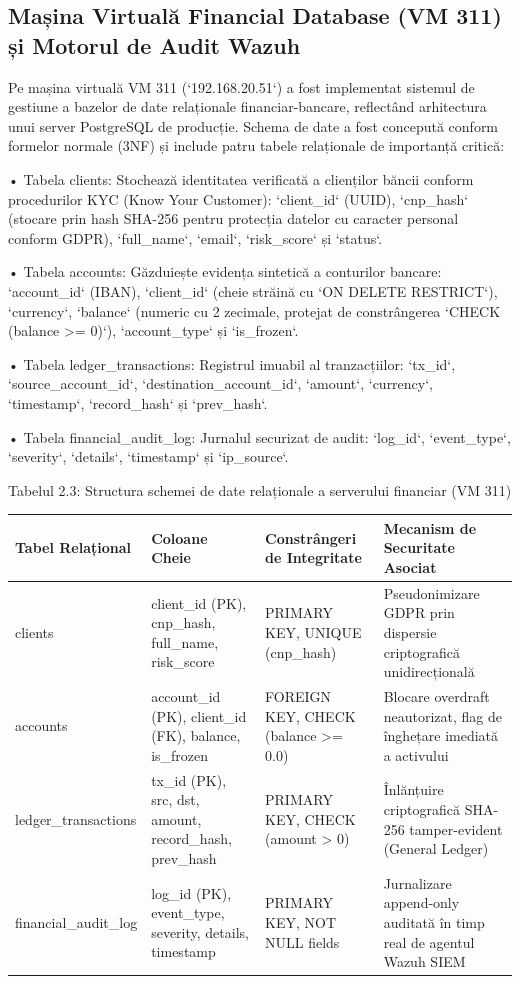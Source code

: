\subsection{Mașina Virtuală Financial Database (VM 311) și Motorul de Audit Wazuh}

Pe mașina virtuală VM 311 (`192.168.20.51`) a fost implementat sistemul de gestiune a bazelor de date relaționale financiar-bancare, reflectând arhitectura unui server PostgreSQL de producție. Schema de date a fost concepută conform formelor normale (3NF) și include patru tabele relaționale de importanță critică:

• Tabela clients: Stochează identitatea verificată a clienților băncii conform procedurilor KYC (Know Your Customer): `client\_id` (UUID), `cnp\_hash` (stocare prin hash SHA-256 pentru protecția datelor cu caracter personal conform GDPR), `full\_name`, `email`, `risk\_score` și `status`.

• Tabela accounts: Găzduiește evidența sintetică a conturilor bancare: `account\_id` (IBAN), `client\_id` (cheie străină cu `ON DELETE RESTRICT`), `currency`, `balance` (numeric cu 2 zecimale, protejat de constrângerea `CHECK (balance >= 0)`), `account\_type` și `is\_frozen`.

• Tabela ledger\_transactions: Registrul imuabil al tranzacțiilor: `tx\_id`, `source\_account\_id`, `destination\_account\_id`, `amount`, `currency`, `timestamp`, `record\_hash` și `prev\_hash`.

• Tabela financial\_audit\_log: Jurnalul securizat de audit: `log\_id`, `event\_type`, `severity`, `details`, `timestamp` și `ip\_source`.

Tabelul 2.3: Structura schemei de date relaționale a serverului financiar (VM 311)

\begin{table}[htbp]
\centering
\small
\begin{tabular}{p{} p{} p{} p{}}
\toprule
Tabel Relațional & Coloane Cheie & Constrângeri de Integritate & Mecanism de Securitate Asociat \\
\midrule
clients & client\_id (PK), cnp\_hash, full\_name, risk\_score & PRIMARY KEY, UNIQUE (cnp\_hash) & Pseudonimizare GDPR prin dispersie criptografică unidirecțională \\
accounts & account\_id (PK), client\_id (FK), balance, is\_frozen & FOREIGN KEY, CHECK (balance >= 0.0) & Blocare overdraft neautorizat, flag de înghețare imediată a activului \\
ledger\_transactions & tx\_id (PK), src, dst, amount, record\_hash, prev\_hash & PRIMARY KEY, CHECK (amount > 0) & Înlănțuire criptografică SHA-256 tamper-evident (General Ledger) \\
financial\_audit\_log & log\_id (PK), event\_type, severity, details, timestamp & PRIMARY KEY, NOT NULL fields & Jurnalizare append-only auditată în timp real de agentul Wazuh SIEM \\
\bottomrule
\end{tabular}
\end{table}

